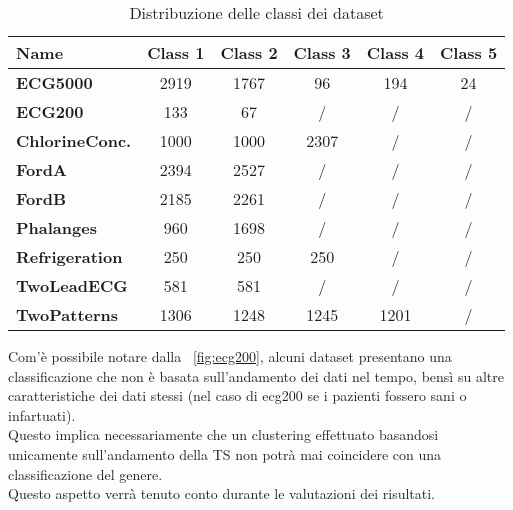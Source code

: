 \begin{table}[H]
	\centering
	\begin{tabularx}{\textwidth}{X c c c c c}
		\hline
		\textbf{Name} & \textbf{Class 1} & \textbf{Class 2} & \textbf{Class 3} & \textbf{Class 4} & \textbf{Class 5} \\
		\hline
		\textbf{ECG5000} & 2919 & 1767 & 96 & 194 & 24\\
		\textbf{ECG200} & 133 & 67 & / & / & /\\
		\textbf{ChlorineConc.} & 1000 & 1000 & 2307 & / & /\\
		\textbf{FordA} & 2394 & 2527 & / & / & /\\
		\textbf{FordB} & 2185 & 2261 & / & / & /\\
		\textbf{Phalanges} & 960 & 1698 & / & / & /\\
		\textbf{Refrigeration} & 250 & 250 & 250 & / & /\\
		\textbf{TwoLeadECG} & 581 & 581 & / & / & /\\
		\textbf{TwoPatterns} & 1306 & 1248 & 1245 & 1201 & /\\
	\end{tabularx}
	\caption{Distribuzione delle classi dei dataset}
	\label{tab:labels}
\end{table}
Com'è possibile notare dalla \figurename~\ref{fig:ecg200}, alcuni dataset presentano una classificazione che non è basata sull'andamento dei dati nel tempo, bensì su altre caratteristiche dei dati stessi (nel caso di ecg200 se i pazienti fossero sani o infartuati).\\
Questo implica necessariamente che un clustering effettuato basandosi unicamente sull'andamento della TS non potrà mai coincidere con una classificazione del genere.\\
Questo aspetto verrà tenuto conto durante le valutazioni dei risultati.

